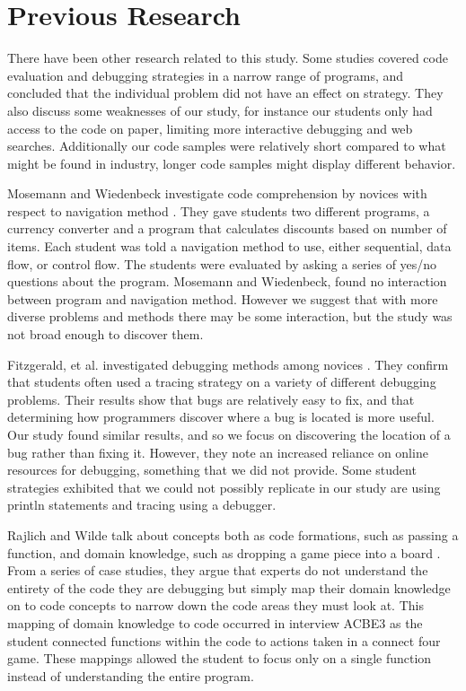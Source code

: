 \section{Previous Research}

There have been other research related to this study.
Some studies covered code evaluation and debugging strategies in a narrow range of programs,
 and concluded that the individual problem did not have an effect on strategy.
They also discuss some weaknesses of our study, for instance our students only had access to the code on paper, limiting more interactive debugging and web searches.
Additionally our code samples were relatively short compared to what might be found in industry,
 longer code samples might display different behavior.

Mosemann and Wiedenbeck investigate code comprehension by novices with respect to navigation method \cite{mosemann2001}.
They gave students two different programs, a currency converter and a program that calculates discounts based on number of items.
Each student was told a navigation method to use, either sequential, data flow, or control flow.
The students were evaluated by asking a series of yes/no questions about the program.
Mosemann and Wiedenbeck, found no interaction between program and navigation method.
However we suggest that with more diverse problems and methods there may be some interaction, but the study was not broad enough to discover them.

Fitzgerald, et al. investigated debugging methods among novices \cite{fitzgerald2008}.
They confirm that students often used a tracing strategy on a variety of different debugging problems.
Their results show that bugs are relatively easy to fix, and that determining how programmers discover where a bug is located is more useful.
Our study found similar results, and so we focus on discovering the location of a bug rather than fixing it.
However, they note an increased reliance on online resources for debugging, something that we did not provide.
Some student strategies exhibited that we could not possibly replicate in our study are using println statements and tracing using a debugger.

Rajlich and Wilde talk about concepts both as code formations, such as passing a function, and domain knowledge, such as dropping a game piece into a board \cite{1021348}.
From a series of case studies, they argue that experts do not understand the entirety of the code they are debugging but simply map their domain knowledge on to code concepts to narrow down the code areas they must look at.
This mapping of domain knowledge to code occurred in interview ACBE3 as the student connected functions within the code to actions taken in a connect four game.
These mappings allowed the student to focus only on a single function instead of understanding the entire program.

